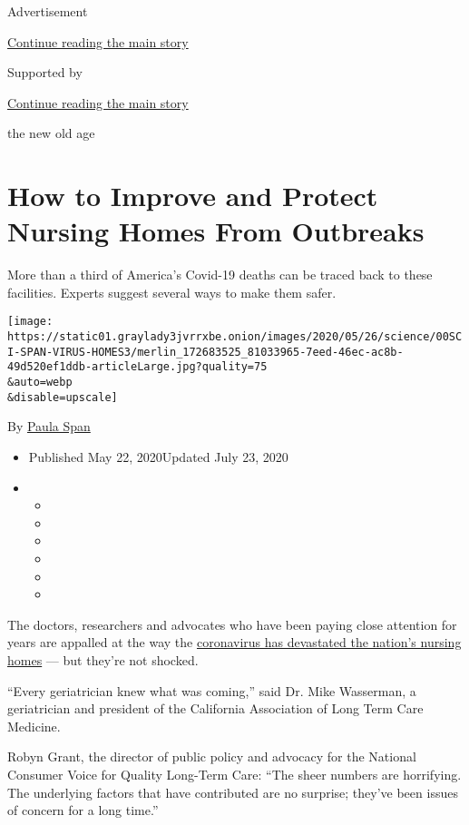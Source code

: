 Advertisement

\protect\hyperlink{after-top}{Continue reading the main story}

Supported by

\protect\hyperlink{after-sponsor}{Continue reading the main story}

the new old age

\hypertarget{how-to-improve-and-protect-nursing-homes-from-outbreaks}{%
\section{How to Improve and Protect Nursing Homes From
Outbreaks}\label{how-to-improve-and-protect-nursing-homes-from-outbreaks}}

More than a third of America's Covid-19 deaths can be traced back to
these facilities. Experts suggest several ways to make them safer.

\texttt{[image: https://static01.graylady3jvrrxbe.onion/images/2020/05/26/science/00SCI-SPAN-VIRUS-HOMES3/merlin\_172683525\_81033965-7eed-46ec-ac8b-49d520ef1ddb-articleLarge.jpg?quality=75\\\&auto=webp\\\&disable=upscale]}

By \href{https://www.nytimes3xbfgragh.onion/by/paula-span}{Paula Span}

\begin{itemize}
\item
  Published May 22, 2020Updated July 23, 2020
\item
  \begin{itemize}
  \item
  \item
  \item
  \item
  \item
  \item
  \end{itemize}
\end{itemize}

The doctors, researchers and advocates who have been paying close
attention for years are appalled at the way the
\href{https://www.nytimes3xbfgragh.onion/2020/07/23/nyregion/nursing-homes-deaths-cuomo.html}{coronavirus
has devastated the nation's nursing homes} --- but they're not shocked.

``Every geriatrician knew what was coming,'' said Dr. Mike Wasserman, a
geriatrician and president of the California Association of Long Term
Care Medicine.

Robyn Grant, the director of public policy and advocacy for the National
Consumer Voice for Quality Long-Term Care: ``The sheer numbers are
horrifying. The underlying factors that have contributed are no
surprise; they've been issues of concern for a long time.''

